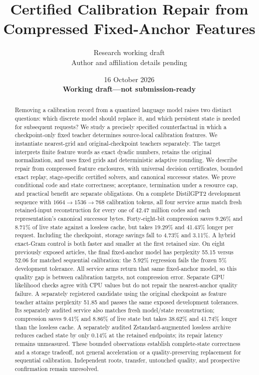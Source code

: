 \documentclass[10pt,twocolumn,letterpaper]{article}
\title{Certified Calibration Repair from Compressed Fixed-Anchor Features}
\author{Research working draft\\Author and affiliation details pending}
\date{16 October 2026\\\textbf{Working draft---not submission-ready}}
\begin{document}
\maketitle

\begin{abstract}
Removing a calibration record from a quantized language model raises two distinct
questions: which discrete model should replace it, and which persistent state is
needed for subsequent requests? We study a precisely specified counterfactual in
which a checkpoint-only fixed teacher determines source-local calibration
features. We instantiate nearest-grid and original-checkpoint teachers separately. The target interprets finite
feature words as exact dyadic numbers, retains the original normalization, and
uses fixed grids and deterministic adaptive rounding. We describe repair from
compressed feature enclosures, with universal decision certificates, bounded
exact replay, stage-specific certified solvers, and canonical successor states.
We prove conditional code and state correctness; acceptance, termination under a
resource cap, and practical benefit are separate obligations. On a complete
DistilGPT2 development sequence with $1664\to1536\to768$ calibration tokens,
all four service arms match fresh retained-input reconstruction for every one
of 42.47 million codes and each representation's canonical successor bytes.
Forty-eight-bit compression saves 9.26\% and 8.71\% of live state against a
lossless cache, but takes 19.29\% and 41.43\% longer per request. Including the
checkpoint, storage savings fall to 4.73\% and 3.11\%. A hybrid exact-Gram control
is both faster and smaller at the first retained size. On eight previously
exposed articles, the final fixed-anchor model has perplexity 55.15 versus 52.06
for matched sequential calibration: the 5.92\% regression fails the frozen
5\% development tolerance. All service arms return that same fixed-anchor
model, so this quality gap is between calibration targets, not compression
error. Separate GPU likelihood checks agree with CPU values but do not repair
the nearest-anchor quality failure. A separately registered candidate using the
original checkpoint as feature teacher attains perplexity 51.85 and passes the
same exposed development tolerances. Its separately audited service also matches
fresh model/state reconstruction; compression saves 9.41\% and 8.86\% of live
state but takes 38.62\% and 41.74\% longer than the lossless cache. A separately
audited Zstandard-augmented lossless archive reduces cached state by only
0.14\% at the retained endpoints; its repair latency remains unmeasured. These bounded
observations establish complete-state correctness and a storage tradeoff, not
general acceleration or a
quality-preserving replacement for sequential calibration. Independent roots,
transfer, untouched quality, and prospective confirmation remain unresolved.
\end{abstract}
\end{document}
